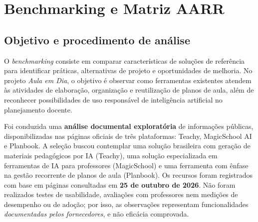 \section{Benchmarking e Matriz AARR}
\label{sec:benchmarking}

\subsection{Objetivo e procedimento de análise}
O \textit{benchmarking} consiste em comparar características de soluções de referência para identificar práticas, alternativas de projeto e oportunidades de melhoria. No projeto \textit{Aula em Dia}, o objetivo é observar como ferramentas existentes atendem às atividades de elaboração, organização e reutilização de planos de aula, além de reconhecer possibilidades de uso responsável de inteligência artificial no planejamento docente.

Foi conduzida uma \textbf{análise documental exploratória} de informações públicas, disponibilizadas nas páginas oficiais de três plataformas: Teachy, MagicSchool AI e Planbook. A seleção buscou contemplar uma solução brasileira com geração de materiais pedagógicos por IA (Teachy), uma solução especializada em ferramentas de IA para professores (MagicSchool) e uma ferramenta com ênfase na gestão recorrente de planos de aula (Planbook). Os recursos foram registrados com base em páginas consultadas em \textbf{25 de outubro de 2026}. Não foram realizados testes de usabilidade, avaliações com professores nem medições de desempenho ou de adoção; por isso, as observações representam funcionalidades \emph{documentadas pelos fornecedores}, e não eficácia comprovada.

